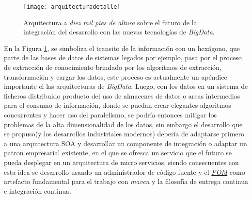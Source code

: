  \begin{figure}[h]
	\centering
	\texttt{[image: arquitecturadetalle]}
	\caption{Arquitectura a \textit{diez mil pies de altura} sobre el futuro de la integración del desarrollo con las nuevas tecnologías de \textit{BigData}.}
	\label{arquitecturadetalle}
\end{figure}

En la Figura \ref{arquitecturadetalle}, se simboliza el transito de la información con un hexágono, que parte de las bases de datos de sistemas legados por ejemplo, pasa por el proceso de extracción de conocimiento brindado por los algoritmos de extracción, transformación y cargar los datos, este proceso es actualmente un apéndice importante el las arquitecturas de \textit{BigData}. Luego, con los datos en un sistema de ficheros distribuido producto del uso de almacenes de datos o areas intermedias para el consumo de información, donde se puedan crear elegantes algoritmos concurrentes y hacer uso del paralelismo, se podría entonces mitigar los problemas de la alta dimensionalidad de los datos\cite{Izenman2006, Liang2015a}, sin embargo el desarrollo que se propuso(y los desarrollos industriales modernos) debería de adaptarse primero a una arquitectura SOA y desarrollar un componente de integración o adaptar un patron empresarial existente, en el que se ofresca un servicio que el futuro se pueda desplegar en un arquitectura de micro servicios, siendo consecuentes con esta idea se desarrollo usando un administrador de código fuente y el \href{https://maven.apache.org/guides/introduction/introduction-to-the-pom.html}{\textit{POM}} como artefacto fundamental para el trabajo con \textit{maven} y la filosofía de entrega continua e integración continua.